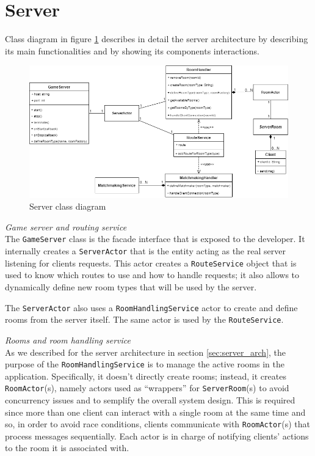 \newpage

\section{Server}
Class diagram in figure \ref{fig:server_class_diagram} describes in detail the server architecture by describing its main functionalities and by showing its components interactions.
\begin{figure}[h]
	\hspace*{-1.1in}
	\includegraphics[scale=0.55]{images/4-design/server_class.png}
	\caption{Server class diagram}
	\label{fig:server_class_diagram}
\end{figure}

\textit{Game server and routing service}
\\
The \texttt{GameServer} class is the facade interface that is exposed to the developer. It internally creates a \texttt{ServerActor} that is the entity acting as the real server listening for clients requests. This actor creates a \texttt{RouteService} object that is used to know which routes to use and how to handle requests; it also allows to dynamically define new room types that will be used by the server.

The \texttt{ServerActor} also uses a \texttt{RoomHandlingService} actor to create and define rooms from the server itself. The same actor is used by the \texttt{RouteService}.

\bigskip
\textit{Rooms and room handling service}
\\
As we described for the server architecture in section \ref{sec:server_arch}, the purpose of the \texttt{RoomHandlingService} is to manage the active rooms in the application. Specifically, it doesn't directly create rooms; instead, it creates \texttt{RoomActor}(s), namely actors used as ``wrappers'' for \texttt{ServerRoom}(s) to avoid concurrency issues and to semplify the overall system design. This is required since more than one client can interact with a single room at the same time and so, in order to avoid race conditions, clients communicate with \texttt{RoomActor}(s) that process messages sequentially. Each actor is in charge of notifying clients' actions to the room it is associated with.

